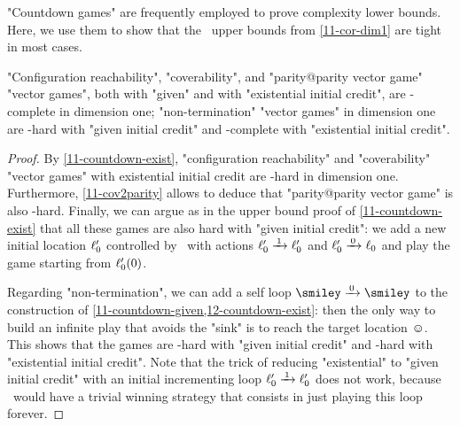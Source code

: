 "Countdown games" are frequently employed to prove complexity lower
bounds.  Here, we use them to show that the \EXPSPACE\ upper bounds
from \cref{11-cor-dim1} are tight in most cases.
\begin{theorem}\label{11-th-dim1}
  "Configuration reachability", "coverability", and "parity@parity
  vector game" "vector games", both with "given" and with "existential
  initial credit", are \EXPSPACE-complete in dimension one;
  "non-termination" "vector games" in dimension one are \EXP-hard with
  "given initial credit" and \EXPSPACE-complete with "existential
  initial credit".
\end{theorem}
\begin{proof}
  By \cref{11-countdown-exist}, "configuration reachability" and
  "coverability" "vector games" with existential initial credit
  are \EXPSPACE-hard in dimension one.
  Furthermore, \cref{11-cov2parity} allows to deduce that
  "parity@parity vector game" is also \EXPSPACE-hard.  Finally, we can
  argue as in the upper bound proof of \cref{11-countdown-exist} that
  all these games are also hard with "given initial credit": we add a
  new initial location $\ell'_0$ controlled by \Eve\ with actions
  $\loc'_0\step 1\loc'_0$ and $\loc'_0\step 0\loc_0$ and play the game
  starting from $\ell'_0(0)$.

  Regarding "non-termination", we can add a self loop $\smiley\step
  0\smiley$ to the construction
  of \cref{11-countdown-given,12-countdown-exist}: then the only way
  to build an infinite play that avoids the "sink" is to reach the
  target location $\smiley$.  This shows that the games are \EXP-hard
  with "given initial credit" and \EXPSPACE-hard with "existential
  initial credit".  Note that the trick of reducing "existential" to
  "given initial credit" with an initial incrementing loop $\loc'_0\step
  1\loc'_0$ does not work, because \Eve\ would have a trivial winning
  strategy that consists in just playing this loop forever.
\end{proof}


